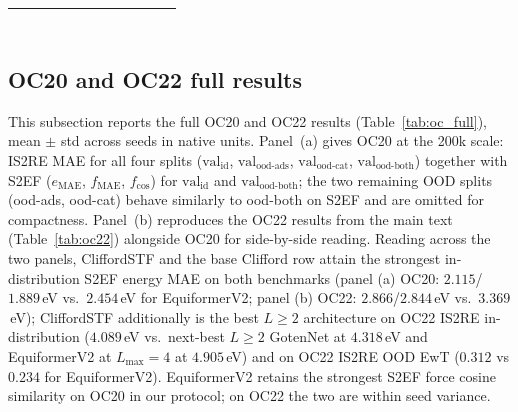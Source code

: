 \begin{table}[h]
{\begin{tabular}{lccccccccccc}
$$\color{gray}{SchNet} & \color{gray}{1.2k $\pm$ 0.8k} & \color{gray}{1.3k $\pm$ 1.0k} & \color{gray}{604.539 $\pm$ 447.764} & \color{gray}{403.595 $\pm$ 239.889} & \color{gray}{588.952 $\pm$ 533.312} & \color{gray}{1.7k $\pm$ 0.7k} & \color{gray}{1.2k $\pm$ 0.4k} & \color{gray}{2.1k $\pm$ 0.9k} & \color{gray}{441.554 $\pm$ 134.053} & \color{gray}{981.058 $\pm$ 333.775} & \color{gray}{1.1k $\pm$ 0.1k} \\
\bottomrule
\end{tabular}%
}
\end{table}

\subsection{OC20 and OC22 full results}\label{supp:oc_full}

This subsection reports the full OC20 and OC22 results (Table~\ref{tab:oc_full}), mean $\pm$ std across seeds in native units. Panel~(a) gives OC20 at the 200k scale: IS2RE MAE for all four splits ($\mathrm{val}_{\text{id}}$, $\mathrm{val}_{\text{ood-ads}}$, $\mathrm{val}_{\text{ood-cat}}$, $\mathrm{val}_{\text{ood-both}}$) together with S2EF ($e_\mathrm{MAE}$, $f_\mathrm{MAE}$, $f_\mathrm{cos}$) for $\mathrm{val}_{\text{id}}$ and $\mathrm{val}_{\text{ood-both}}$; the two remaining OOD splits (ood-ads, ood-cat) behave similarly to ood-both on S2EF and are omitted for compactness. Panel~(b) reproduces the OC22 results from the main text (Table~\ref{tab:oc22}) alongside OC20 for side-by-side reading. Reading across the two panels, CliffordSTF and the base Clifford row attain the strongest in-distribution S2EF energy MAE on both benchmarks (panel (a) OC20: $2.115$/$1.889$\,eV vs.\ $2.454$\,eV for EquiformerV2; panel (b) OC22: $2.866$/$2.844$\,eV vs.\ $3.369$\,eV); CliffordSTF additionally is the best $L\!\geq\!2$ architecture on OC22 IS2RE in-distribution ($4.089$\,eV vs.\ next-best $L\!\geq\!2$ GotenNet at $4.318$\,eV and EquiformerV2 at $L_{\max}\!=\!4$ at $4.905$\,eV) and on OC22 IS2RE OOD EwT ($0.312$ vs $0.234$ for EquiformerV2). EquiformerV2 retains the strongest S2EF force cosine similarity on OC20 in our protocol; on OC22 the two are within seed variance.

